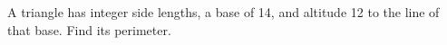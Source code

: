A triangle has integer side lengths, a base of 14, and altitude 12 to the line of that base. Find its perimeter.
